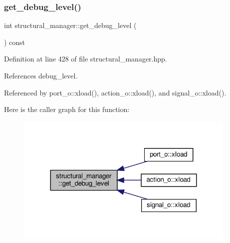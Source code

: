 \mbox{\label{classstructural__manager_a062bf9fd8673b256c4bdd8469b5de2c1}} 
\subsubsection{\texorpdfstring{get\+\_\+debug\+\_\+level()}{get\_debug\_level()}}
{\footnotesize\ttfamily int structural\+\_\+manager\+::get\+\_\+debug\+\_\+level (\begin{DoxyParamCaption}{ }\end{DoxyParamCaption}) const\hspace{0.3cm}{\ttfamily [inline]}}



Definition at line 428 of file structural\+\_\+manager.\+hpp.



References debug\+\_\+level.



Referenced by port\+\_\+o\+::xload(), action\+\_\+o\+::xload(), and signal\+\_\+o\+::xload().

Here is the caller graph for this function\+:
\nopagebreak
\begin{figure}[H]
\begin{center}
\leavevmode
\includegraphics[width=299pt]{d7/d6b/classstructural__manager_a062bf9fd8673b256c4bdd8469b5de2c1_icgraph}
\end{center}
\end{figure}
\mbox{\label{classstructural__manager_adae0e39bd8724281a9560aafb17ef445}} 
